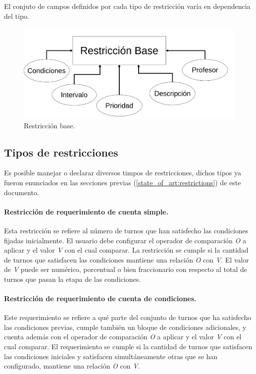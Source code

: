 El conjuto de campos definidos por cada tipo de restricción varía en dependencia del tipo.

\begin{figure}[h]
	\centering
	\includegraphics[width=0.75\linewidth]{images/Chapter 2/base_restrictions}
	\caption{Restricción base.}
	\label{fig:base_restrictions}
\end{figure}

\subsection{Tipos de restricciones}

Es posible manejar o declarar diversos timpos de restricciones, dichos tipos ya fueron enunciados en las secciones previas (\ref{state_of_art:restrictions}) de este documento.

\paragraph{Restricción de requerimiento de cuenta simple.}  Esta restricción se refiere al número de turnos que han satisfecho las 
 condiciones fijadas inicialmente. El usuario debe configurar el operador de comparación \textit{O} a aplicar y el valor \textit{V} con el cual comparar. La restricción se cumple si la cantidad de turnos que satisfacen las condiciones mantiene una relación \textit{O} con \textit{V}. El valor de \textit{V} puede ser numérico, porcentual o bien fraccionario  con respecto al total de turnos que pasan la etapa de las condiciones.

\paragraph{Restricción de requerimiento de cuenta de condiciones.} Este requerimiento se refiere a qué parte del conjunto de turnos que ha 
 satisfecho las condiciones previas, cumple también un bloque de condiciones adicionales, y cuenta además con el operador de comparación \textit{O} a aplicar y el valor \textit{V} con el cual comparar. El requerimiento se cumple si la cantidad de turnos que satisfacen las condiciones iniciales y satisfacen simultáneamente otras que se han configurado, mantiene una relación \textit{O} con \textit{V}.


